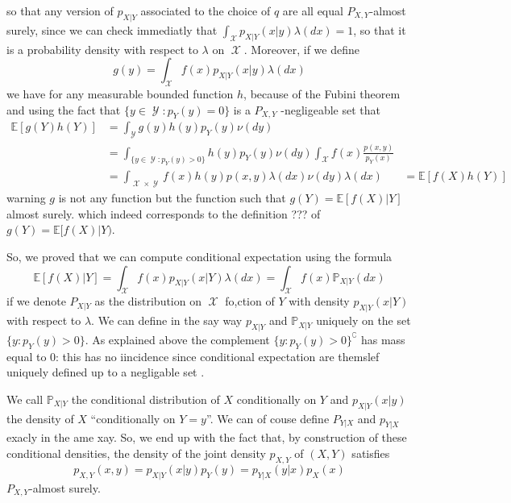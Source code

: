 \documentclass[
	fontsize=11pt, %
	twoside=false, %
	numbers=noenddot, %
]{kaobook}
\DeclareMathOperator{\cX}{{\mathcal X}}
\DeclareMathOperator{\cY}{{\mathcal Y}}
\renewcommand{\P}{\mathbb P}
\newcommand{\E}{\mathbb E}
\begin{document}
so that any version of $p_{X | Y}$ associated to the choice of $q$ are all equal $P_{X, Y}$-almost surely, since we can check immediatly that $\int_{\cX} p_{X | Y}(x | y) \lambda(dx) = 1$, so that it is a probability density with respect to $\lambda$ on $\cX$.
Moreover, if we define
\begin{equation*}
	g(y) = \int_{\cX} f(x) p_{X | Y}(x | y) \lambda(dx)
\end{equation*}
we have for any measurable bounded function $h$, because of the Fubini theorem and using the fact that $\{y \in \cY : p_Y(y) = 0\}$ is a $P_{X, Y}$ -negligeable set that
\begin{align*}
	\E[ g(Y) h(Y)] &= \int_{\cY} g(y) h(y) p_Y(y) \nu(dy) \\
	&= \int_{\{ y \in \cY : p_Y(y) > 0 \}} h(y) p_Y(y) \nu(dy) \int_{\cX} f(x) \frac{p(x, y)}{p_Y(x)} \\
	&= \int_{\cX \times \cY} f(x) h(y) p(x, y) \lambda(dx) \nu(dy) \lambda (dx)
	&= \E[ f(X) h(Y)]
\end{align*}
warning $g$ is not any function but the function such that $g(Y) = \E[ f(X) | Y]$ almost surely.
which indeed corresponds to the definition ??? of $g(Y) = \E[f(X) | Y)$.

So, we proved that we can compute conditional expectation using the formula
\begin{equation*}
	\E[f(X) | Y] = \int_{\cX} f(x) p_{X | Y}(x | Y) \lambda(dx) = \int_{\cX} f(x) \P_{X | Y} (dx)
\end{equation*}
if we denote $P_{X | Y}$ as the distribution on $\cX$ fo,ction of $Y$ with density $p_{X | Y}(x | Y)$ with respect to $\lambda$. 
We can define in the say way $p_{X | Y}$ and $\P_{X | Y}$ uniquely on the set $\{ y : p_Y(y) > 0 \}$.
As explained above the complement $\{ y : p_Y(y) > 0 \}^\complement$ has mass equal to $0$: this has no iincidence since conditional expectation are themslef uniquely defined up to a negligable set .

We call $\P_{X | Y}$ the conditional distribution of $X$ conditionally on $Y$ and $p_{X | Y}(x | y)$ the density of $X$ ``conditionally on $Y=y$''. We can of couse define $P_{Y | X}$ and $p_{Y | X}$ exacly in the ame xay.
So, we end up with the fact that, by construction of these conditional densities, the density of the joint density $p_{X, Y}$ of $(X, Y)$  satisfies
\begin{equation}
	\label{eq:cond-density-formula}
	p_{X, Y}(x, y) = p_{X | Y}(x | y) p_Y(y) = p_{Y | X}(y | x) p_X(x)
\end{equation}
$P_{X, Y}$-almost surely.
\end{document}
